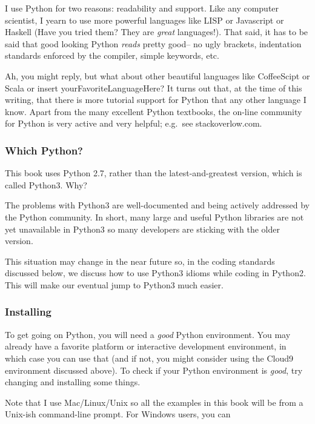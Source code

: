 I use Python for two reasons: readability and support. Like any computer
scientist, I yearn to use more powerful languages like LISP or
Javascript or Haskell (Have you tried them? They are \emph{great}
languages!). That said, it has to be said that good looking Python
\emph{reads} pretty good-- no ugly brackets, indentation standards
enforced by the compiler, simple keywords, etc.

Ah, you might reply, but what about other beautiful languages like
CoffeeScipt or Scala or insert yourFavoriteLanguageHere? It turns out
that, at the time of this writing, that there is more tutorial support
for Python that any other language I know. Apart from the many excellent
Python textbooks, the on-line community for Python is very active and
very helpful; e.g.~see stackoverlow.com.

\subsubsection{Which Python?}\label{which-python}

This book uses Python 2.7, rather than the latest-and-greatest version,
which is called Python3. Why?

The problems with Python3 are well-documented and being actively
addressed by the Python community. In short, many large and useful
Python libraries are not yet unavailable in Python3 so many developers
are sticking with the older version.

This situation may change in the near future so, in the coding standards
discussed below, we discuss how to use Python3 idioms while coding in
Python2. This will make our eventual jump to Python3 much easier.

\subsubsection{Installing}\label{installing}

To get going on Python, you will need a \emph{good} Python environment.
You may already have a favorite platform or interactive development
environment, in which case you can use that (and if not, you might
consider using the Cloud9 environment discussed above). To check if your
Python environment is \emph{good}, try changing and installing some
things.

Note that I use Mac/Linux/Unix so all the examples in this book will be
from a Unix-ish command-line prompt. For Windows users, you can

